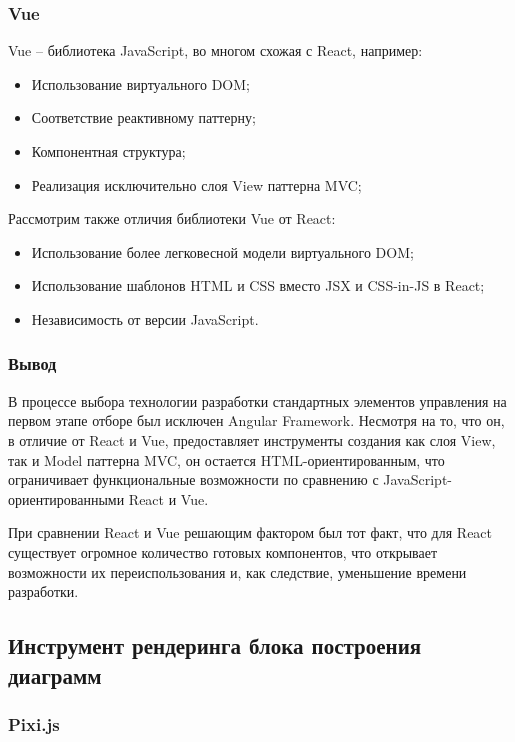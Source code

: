 \subsubsection{Vue}

Vue – библиотека JavaScript, во многом схожая с React, например:

\begin{itemize}
	\item Использование виртуального DOM;
	\item Соответствие реактивному паттерну;
	\item Компонентная структура;
	\item Реализация исключительно слоя View паттерна MVC;
\end{itemize}

Рассмотрим также отличия библиотеки Vue от React:

\begin{itemize}
	\item Использование более легковесной модели виртуального DOM;
	\item Использование шаблонов HTML и CSS вместо JSX и CSS-in-JS в React;
	\item Независимость от версии JavaScript.
\end{itemize}

\subsubsection{Вывод}

В процессе выбора технологии разработки стандартных элементов управления на первом этапе отборе был исключен Angular Framework. Несмотря на то, что он, в отличие от React и Vue, предоставляет инструменты создания как слоя View, так и Model паттерна MVC, он остается HTML-ориентированным, что ограничивает функциональные возможности по сравнению с JavaScript-ориентированными React и Vue.

При сравнении React и Vue решающим фактором был тот факт, что для React существует огромное количество готовых компонентов, что открывает возможности их переиспользования и, как следствие, уменьшение времени разработки.

\subsection{Инструмент рендеринга блока построения диаграмм}

\subsubsection{Pixi.js}

